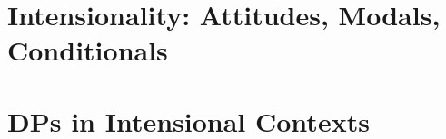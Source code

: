 \documentclass{kvf-lecturenotes}
\begin{document}
\dominitoc

 

\mainmatter

\pagestyle{kaiheadings}

 \part{Intensionality: Attitudes, Modals, Conditionals}

  
 
 
 

\part{DPs in Intensional Contexts}
%




\printbibliography
 
\end{document}
